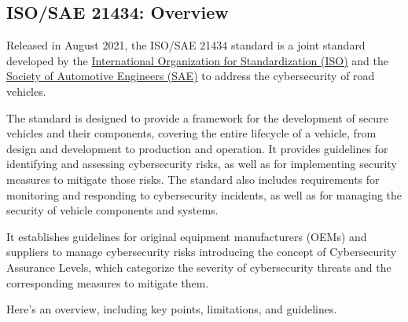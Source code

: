 \subsection{ISO/SAE 21434: Overview}\label{subsec:iso-sae-21434}

Released in August 2021, the ISO/SAE 21434 standard is a joint standard
developed by the \href{https://www.iso.org/home.html}{International Organization for Standardization (ISO)} and the
\href{https://www.sae.org/}{Society of Automotive Engineers (SAE)} to address the cybersecurity of road vehicles.

The standard is designed to provide a framework for the development of secure vehicles and their components,
covering the entire lifecycle of a vehicle, from design and development to production and operation.
It provides guidelines for identifying and assessing cybersecurity risks, as well as for implementing security measures to mitigate those risks.
The standard also includes requirements for monitoring and responding to cybersecurity incidents, as well as for managing the security of vehicle components and systems.

It establishes guidelines for original equipment manufacturers (OEMs) and suppliers to manage cybersecurity risks introducing the concept of Cybersecurity Assurance Levels,
which categorize the severity of cybersecurity threats and the corresponding measures to mitigate them\cite{moukahal2021towards,iso-correlation}.

Here's an overview, including key points, limitations, and guidelines.


